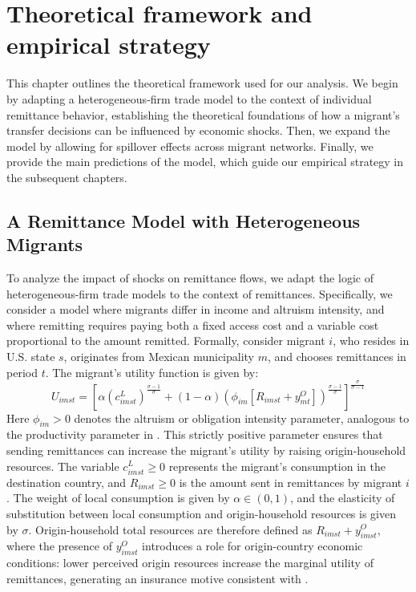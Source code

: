 \chapter{Theoretical framework and empirical strategy} \label{chap:structural_model}

This chapter outlines the theoretical framework used for our analysis. We begin by adapting a heterogeneous-firm trade model to the context of individual remittance behavior, establishing the theoretical foundations of how a migrant's transfer decisions can be influenced by economic shocks. Then, we expand the model by allowing for spillover effects across migrant networks. Finally, we provide the main predictions of the model, which guide our empirical strategy in the subsequent chapters.

\section{A Remittance Model with Heterogeneous Migrants}

To analyze the impact of shocks on remittance flows, we adapt the logic of heterogeneous-firm trade models to the context of remittances. Specifically, we consider a model where migrants differ in income and altruism intensity, and where remitting requires paying both a fixed access cost and a variable cost proportional to the amount remitted. Formally, consider migrant $i$, who resides in U.S. state $s$, originates from Mexican municipality $m$, and chooses remittances in period $t$. The migrant's utility function is given by:
\begin{equation}
    U_{imst}
    =
    \left[
    \alpha
    \left(c^L_{imst}\right)^{\frac{\sigma-1}{\sigma}}
    +
    (1-\alpha)
    \left(
    \phi_{im}
    \left[
    R_{imst}
    +
    {y}^O_{mt}
    \right]
    \right)^{\frac{\sigma-1}{\sigma}}
    \right]^{\frac{\sigma}{\sigma-1}}
\end{equation}
Here $\phi_{im} > 0$ denotes the altruism or obligation intensity parameter, analogous to the productivity parameter in \textcite{melitz2003}. This strictly positive parameter ensures that sending remittances can increase the migrant's utility by raising origin-household resources. The variable $c^L_{imst} \geq 0$ represents the migrant's consumption in the destination country, and $R_{imst} \geq 0$ is the amount sent in remittances by migrant $i$. The weight of local consumption is given by $\alpha \in (0,1)$, and the elasticity of substitution between local consumption and origin-household resources is given by $\sigma$. Origin-household total resources are therefore defined as $R_{imst} + y^O_{imst}$, where the presence of $y^O_{imst}$ introduces a role for origin-country economic conditions: lower perceived origin resources increase the marginal utility of remittances, generating an insurance motive consistent with \textcite{yang_choi_2007}.

